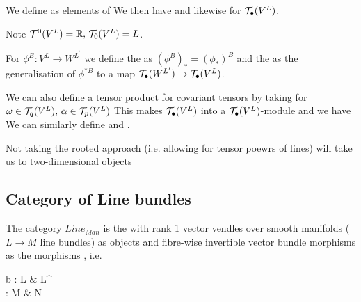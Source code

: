 \documentclass{article}
\begin{document}
\begin{definition}
	We define  as elements of 
We then have
and likewise for $\mathcal{T}_\bullet(V^L)$. 
\end{definition}

\begin{example}
	Note $\mathcal{T}^0(V^L) = \mathbb{R}, \, \mathcal{T}_0(V^L) = L$.
\end{example}

\begin{definition}
	For $\phi^B : V^L \to W^{L^\prime}$ we define the  as $(\phi^B)_\ast = (\phi_\ast)^B$ and the  as the generalisation of $\phi^{\ast B}$ to a map $\mathcal{T}_\bullet(W^{L^\prime}) \to \mathcal{T}_\bullet(V^L)$.  
\end{definition}

We can also define a tensor product for covariant tensors by taking for $\omega \in \mathcal{T}_q(V^L), \, \alpha \in \mathcal{T}_p(V^L)$
This makes $\mathcal{T}_\bullet(V^L)$ into a $\mathcal{T}_\bullet(V^L)$-module and we have 
We can similarly define  and . 

\begin{remark}
Not taking the rooted approach (i.e. allowing for tensor poewrs of lines) will take us to two-dimensional objects 
\end{remark}

\subsection{Category of Line bundles}

\begin{definition}
	The category $Line_{Man}$ is the  with rank 1 vector vendles over smooth manifolds ($L\to M$ line bundles) as objects and fibre-wise invertible vector bundle morphisms as the morphisms , i.e. 
\begin{tkz} 
	b : L \arrow[r] \arrow[d] & L^\prime \arrow[d] \\ 
	\phi : M \arrow[r] & N 
\end{tkz}
\end{definition}
\end{document}
